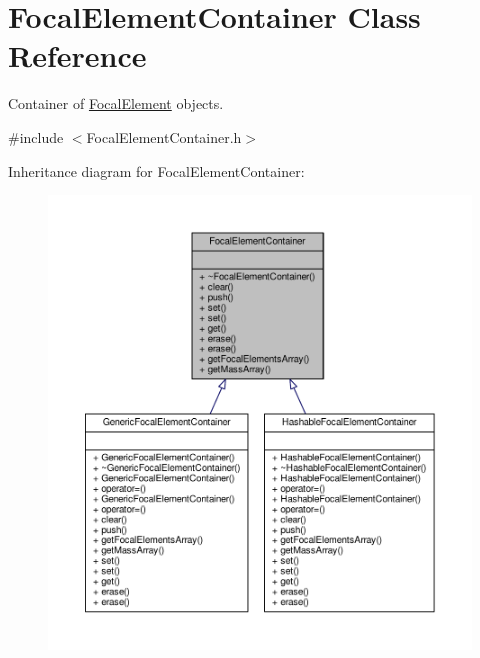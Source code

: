 \hypertarget{classFocalElementContainer}{}\section{Focal\+Element\+Container Class Reference}
\label{classFocalElementContainer}


Container of \hyperlink{classFocalElement}{Focal\+Element} objects.  




{\ttfamily \#include $<$Focal\+Element\+Container.\+h$>$}



Inheritance diagram for Focal\+Element\+Container\+:
\nopagebreak
\begin{figure}[H]
\begin{center}
\leavevmode
\includegraphics[width=350pt]{classFocalElementContainer__inherit__graph}
\end{center}
\end{figure}


